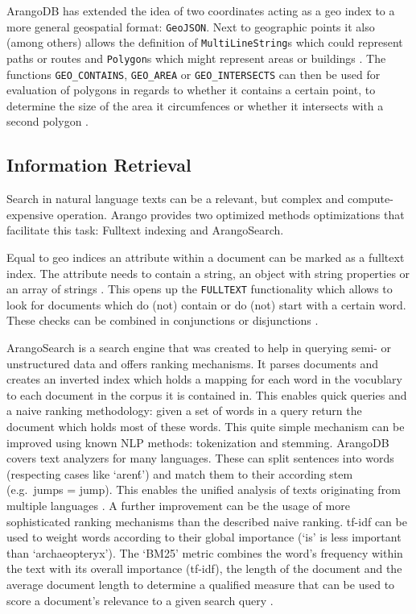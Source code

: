 ArangoDB has extended the idea of two coordinates acting as a geo index to a more general geospatial format: \texttt{GeoJSON}. Next to geographic points it also (among others) allows the definition of \texttt{MultiLineString}s which could represent paths or routes and \texttt{Polygon}s which might represent areas or buildings \parencite{GeoJSON}.
The functions \texttt{GEO\_CONTAINS}, \texttt{GEO\_AREA} or \texttt{GEO\_INTERSECTS} can then be used for evaluation of polygons in regards to whether it contains a certain point, to determine the size of the area it circumfences or whether it intersects with a second polygon \parencite{GeoFunc}.

\subsection{Information Retrieval}

Search in natural language texts can be a relevant, but complex and compute-expensive operation. Arango provides two optimized methods optimizations that facilitate this task: Fulltext indexing and ArangoSearch.

Equal to geo indices an attribute within a document can be marked as a fulltext index. The attribute needs to contain a string, an object with string properties or an array of strings \parencite{FulltextIndex}. This opens up the \texttt{FULLTEXT} functionality which allows to look for documents which do (not) contain or do (not) start with a certain word. These checks can be combined in conjunctions or disjunctions \parencite{FulltextFunc}.

ArangoSearch is a search engine that was created to help in querying semi- or unstructured data and offers ranking mechanisms. It parses documents and creates an inverted index which holds a mapping for each word in the vocublary to each document in the corpus it is contained in. This enables quick queries and a naive ranking methodology: given a set of words in a query return the document which holds most of these words.
This quite simple mechanism can be improved using known NLP methods: tokenization and stemming. ArangoDB covers text analyzers for many languages. These can split sentences into words (respecting cases like `aren\'t') and match them to their according stem (e.g.\ jumps = jump). This enables the unified analysis of texts originating from multiple languages \parencite{ArangoSearchTut}.
A further improvement can be the usage of more sophisticated ranking mechanisms than the described naive ranking. \gls{tf-idf} can be used to weight words according to their global importance (`is' is less important than `archaeopteryx').
The `BM25' metric combines the word's frequency within the text with its overall importance (\gls{tf-idf}), the length of the document and the average document length to determine a qualified measure that can be used to score a document's relevance to a given search query \parencite{robertson_probabilistic_2009}. 

